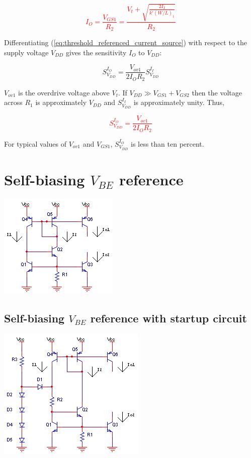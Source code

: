 \textcolor{red}{
\begin{equation}
I_{O} = \frac{V_{GS1}}{R_{2}} = \frac{V_{t} + \sqrt{\frac{2I_{I}}{k'(W/L)_{1}}}}{R_{2}}
\label{eq:threshold_referenced_current_source}
\end{equation}
}

Differentiating (\ref{eq:threshold_referenced_current_source}) with respect to the supply voltage $V_{DD}$ gives the sensitivity $I_{O}$ to $V_{DD}$:

\begin{equation}
S_{{V}_{DD}}^{{I}_{O}} = \frac{V_{ov1}}{2I_{O}R_{2}}S_{{V}_{DD}}^{{I}_{I}}
\end{equation}

$V_{ov1}$ is the overdrive voltage above $V_{t}$.
If $V_{DD} \gg V_{GS1} + V_{GS2}$ then the voltage across $R_1$ is approximately $V_{DD}$ and $S_{{V}_{DD}}^{{I}_{I}}$ is approximately unity.
Thus,

\textcolor{red}{
\begin{equation}
S_{{V}_{DD}}^{{I}_{O}} = \frac{V_{ov1}}{2I_{O}R_{2}}
\end{equation}
}

For typical values of $V_{ov1}$ and $V_{GS1}$, $S_{{V}_{DD}}^{{I}_{O}}$ is less than ten percent.

\section{Self-biasing $V_{BE}$ reference}
\begin{center}
	\includegraphics{schematics/self-biasing_Vbe_reference.PNG}
\end{center}
\autocite[311]{analysis-design-analog-ics}

\subsection{Self-biasing $V_{BE}$ reference with startup circuit}
\begin{center}
	\includegraphics{schematics/self-biasing_Vbe_reference_startup.PNG}
\end{center}
\autocite[312]{analysis-design-analog-ics}

